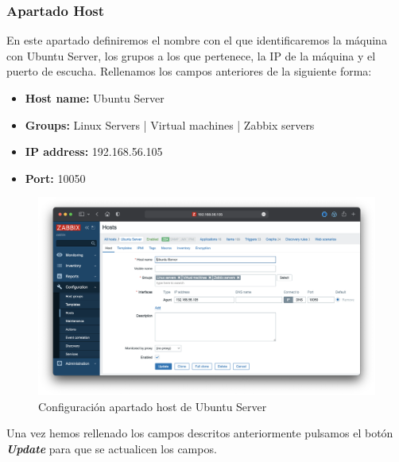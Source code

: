 \subsubsection{Apartado Host}
En este apartado definiremos el nombre con el que identificaremos la máquina con Ubuntu Server, los grupos a los que pertenece, la IP de la máquina y el puerto de escucha.
Rellenamos los campos anteriores de la siguiente forma:
    \begin{itemize}
        \item \textbf{Host name:} Ubuntu Server
        \item \textbf{Groups:} Linux Servers | Virtual machines | Zabbix servers
        \item \textbf{IP address:} 192.168.56.105
        \item \textbf{Port:} 10050
    \end{itemize}
    \begin{figure}[H]
        \centering
        \includegraphics[scale=0.35]{images/ubuntu_server_conf.png}
        \caption{Configuración apartado host de Ubuntu Server}
        \label{fig:ubuntu_server_conf}
    \end{figure}
Una vez hemos rellenado los campos descritos anteriormente pulsamos el botón \textbf{\emph{Update}} para que se actualicen los campos.

